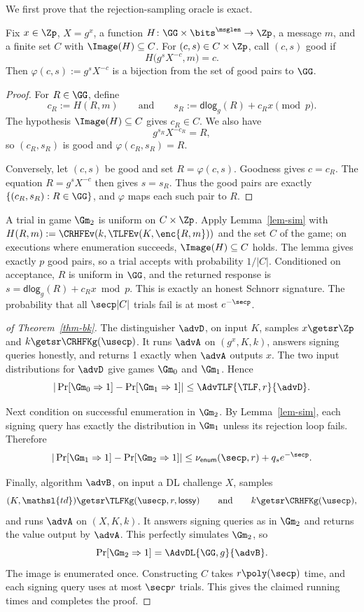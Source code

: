 We first prove that the rejection-sampling oracle is exact.

\begin{lemma} \label{lem-sim}
Fix $x\in\Zp$, $X=g^x$, a function $H \colon \GG \times \bits^{\msglen} \to \Zp$, a message $m$, and a finite set $C$ with $\Image(H) \subseteq C$. For $(c,s)\in C\times\Zp$, call $(c,s)$ good if
$$
H\bigl(g^sX^{-c},m\bigr)=c.
$$
Then $\varphi(c,s):=g^sX^{-c}$ is a bijection from the set of good pairs to $\GG$.
\end{lemma}

\begin{proof}
For $R\in\GG$, define
$$
c_R:=H(R,m)
\qquad\text{and}\qquad
s_R:=\mathsf{dlog}_g(R)+c_Rx\pmod p.
$$
The hypothesis $\Image(H) \subseteq C$ gives $c_R\in C$. We also have
$$
g^{s_R}X^{-c_R}=R,
$$
so $(c_R,s_R)$ is good and $\varphi(c_R,s_R)=R$.

Conversely, let $(c,s)$ be good and set $R=\varphi(c,s)$. Goodness gives $c=c_R$. The equation $R=g^sX^{-c}$ then gives $s=s_R$. Thus the good pairs are exactly $\{(c_R,s_R):R\in\GG\}$, and $\varphi$ maps each such pair to $R$.
\end{proof}

A trial in game $\Gm_2$ is uniform on $C\times\Zp$. Apply Lemma~\ref{lem-sim} with $H(R,m) := \CRHFEv(k,\TLFEv(K,\enc{R,m}))$ and the set $C$ of the game; on executions where enumeration succeeds, $\Image(H) \subseteq C$ holds. The lemma gives exactly $p$ good pairs, so a trial accepts with probability $1/|C|$. Conditioned on acceptance, $R$ is uniform in $\GG$, and the returned response is $s=\mathsf{dlog}_g(R)+c_Rx\bmod p$. This is exactly an honest Schnorr signature. The probability that all $\secp|C|$ trials fail is at most $e^{-\secp}$.

\begin{proof}[of Theorem~\ref{thm-bk}]
The distinguisher $\advD$, on input $K$, samples $x\getsr\Zp$ and $k\getsr\CRHFKg(\usecp)$. It runs $\advA$ on $(g^x,K,k)$, answers signing queries honestly, and returns 1 exactly when $\advA$ outputs $x$. The two input distributions for $\advD$ give games $\Gm_0$ and $\Gm_1$. Hence
$$
|\Pr[\Gm_0\Rightarrow1]-\Pr[\Gm_1\Rightarrow1]|
\le\AdvTLF{\TLF,r}{\advD}.
$$

Next condition on successful enumeration in $\Gm_2$. By Lemma~\ref{lem-sim}, each signing query has exactly the distribution in $\Gm_1$ unless its rejection loop fails. Therefore
$$
|\Pr[\Gm_1\Rightarrow1]-\Pr[\Gm_2\Rightarrow1]|
\le\nu_{\mathsf{enum}}(\secp,r)+q_se^{-\secp}.
$$

Finally, algorithm $\advB$, on input a DL challenge $X$, samples
$$
(K,\mathsl{td})\getsr\TLFKg(\usecp,r,\mathsf{lossy})
\qquad\text{and}\qquad
k\getsr\CRHFKg(\usecp),
$$
and runs $\advA$ on $(X,K,k)$. It answers signing queries as in $\Gm_2$ and returns the value output by $\advA$. This perfectly simulates $\Gm_2$, so
$$
\Pr[\Gm_2\Rightarrow1]=\AdvDL{\GG,g}{\advB}.
$$
The image is enumerated once. Constructing $C$ takes $r\poly(\secp)$ time, and each signing query uses at most $\secp r$ trials. This gives the claimed running times and completes the proof.
\end{proof}

